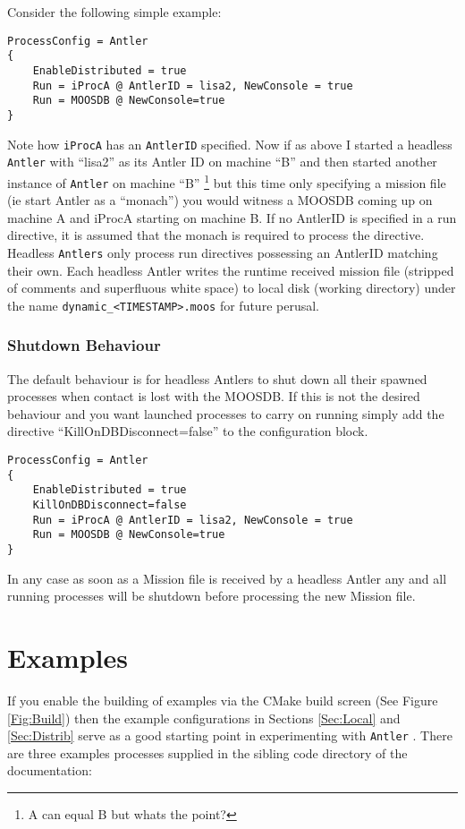 \documentclass[a4paper,10pt]{article}
\newcommand{\Code}[1]{\texttt{#1} }
\newcommand{\code}[1]{\Code{#1} }
\begin{document}
Consider the following simple example:

\begin{lstlisting}
ProcessConfig = Antler
{
	EnableDistributed = true
	Run = iProcA @ AntlerID = lisa2, NewConsole = true	
	Run = MOOSDB @ NewConsole=true
}
\end{lstlisting}

Note how \code{iProcA} has an \code{AntlerID} specified. Now if as above I started a headless \code{Antler} with ``lisa2'' as its Antler ID on machine ``B'' and then started another instance of \code{Antler}  on machine ``B'' \footnote{ A can equal B but whats the point?} but this time only specifying a mission file (ie start Antler as a ``monach'') you would witness a MOOSDB coming up on machine A and iProcA
starting on machine B. If no AntlerID is specified in a run directive, it is assumed that the monach is required to  process the directive. Headless \code{Antlers} only process run directives possessing an AntlerID matching their own. Each headless Antler writes the runtime received mission file (stripped of comments and superfluous white space) to local disk (working directory) under the name \code{dynamic\_<TIMESTAMP>.moos} for future perusal.


\subsubsection{Shutdown Behaviour}

The default behaviour is for headless Antlers to shut down all their spawned processes when contact is lost with the MOOSDB. If this is not the desired behaviour and you want launched processes to carry on running simply add the directive ``KillOnDBDisconnect=false'' to the configuration block.

\begin{lstlisting}
ProcessConfig = Antler
{
	EnableDistributed = true
	KillOnDBDisconnect=false
	Run = iProcA @ AntlerID = lisa2, NewConsole = true	
	Run = MOOSDB @ NewConsole=true
}
\end{lstlisting}

In any case as soon as a Mission file is received by a headless Antler any and all running processes will be shutdown before processing the new Mission file.


\section{Examples}

If you enable the building of examples via the CMake build screen (See Figure \ref{Fig:Build}) then the example configurations in Sections \ref{Sec:Local} and \ref{Sec:Distrib} serve as a good starting point in experimenting with \code{Antler}.  There are three examples processes supplied in the sibling code directory of the documentation:
\end{document}
